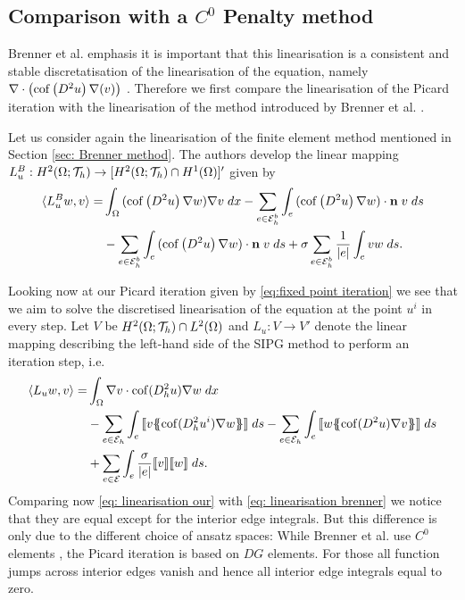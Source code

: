 \subsection{Comparison with a $C^0$ Penalty method}
Brenner et al. emphasis it is important that this linearisation is a consistent and stable discretatisation of the linearisation of the \MA equation, namely $\nabla \cdot \left( \operatorname{cof} \left( D^2 u  \right) \nabla (v) \right)$ \cite[Remark 2.2]{BGN+2011}.
Therefore we first compare the linearisation of the Picard iteration with the linearisation of the method introduced by Brenner et al. \cite{BGN+2011}.

Let us consider again the linearisation of the finite element method mentioned in Section \ref{sec: Brenner method}. The authors develop the linear mapping $L^B_u:H^2(\Omega; \mathcal{T}_h) \rightarrow [H^2(\Omega; \mathcal{T}_h) \cap H^1(\Omega)]'$ given by
\begin{align}
 \langle L^B_{u} w, v \rangle
	=&\int_{\Omega} {{ (\operatorname{cof} \left( D^2  u \right)\nabla w) \nabla v}\;dx}
		- \sum_{e \in \mathcal{E}_h^b} \int_{e} {{ (\operatorname{cof} \left( D^2 u \right)\nabla w) \cdot \mathbf n \; v}\;ds} \nonumber \\
		&-  \sum_{e \in \mathcal{E}_h^b} \int_{e} {{ (\operatorname{cof} \left( D^2 u \right)\nabla w) \cdot \mathbf n \; v}\;ds} 
		+ \sigma \sum_{e \in \mathcal{E}_h^b} \frac 1 {|e|} \int_{e} {{ v w}\;ds}.
		\label{eq: linearisation brenner}
\end{align}


Looking now at our Picard iteration given by \eqref{eq:fixed point iteration} we see that we aim to solve the discretised linearisation of the \MA equation at the point $u^i$ in every step.
Let $V$ be $H^2(\Omega; \mathcal{T}_h) \cap L^2(\Omega)$ and $L_u: V \rightarrow V'$ denote the linear mapping describing the left-hand side of the SIPG method to perform an iteration step, i.e.
\begin{align}
	\bilin {L_u w} v =
 &\myIntX  \Omega { \nabla v \cdot \cof(D_h^2 u) \nabla w } \nonumber\\
 & -\sum\limits_{e \in \edges}\myIntS e { \jump {v \average { \cof(D_h^2 u^{i}) \nabla w} }}
 - \sum\limits_{e \in \edges}\myIntS e { \jump {w \average{ \cof(D^2 u) \nabla v} }} \nonumber\\  
 & +\sum\limits_{e \in \bigEps} \myIntS e { \frac \sigma {|e|} \jump {v}  \jump {w}}. \label{eq: linearisation our}
\end{align}
Comparing now \eqref{eq: linearisation our} with \eqref{eq: linearisation brenner} we notice that they are equal except for the interior edge integrals. But this difference is only due to the different choice of ansatz spaces: While Brenner et al. use $C^0$ elements \cite{BGN+2011}, the Picard iteration is based on $DG$ elements. For those all function jumps across interior edges vanish and hence all interior edge integrals equal to zero.

